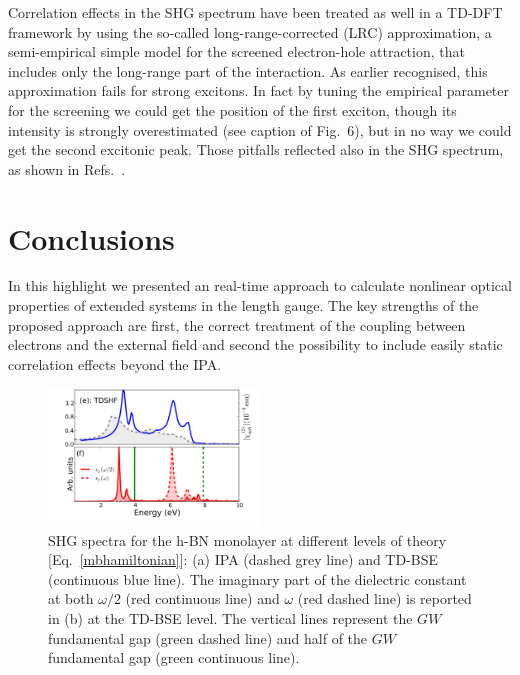 Correlation effects in the SHG spectrum have been treated as well in a TD-DFT framework\cite{PhysRevB.82.235201} by using the so-called long-range-corrected (LRC) approximation,\cite{LRC} a semi-empirical simple model for the screened electron-hole attraction, that includes only the long-range part of the interaction. %
As earlier recognised, this approximation fails for strong excitons. In fact by tuning the empirical parameter for the screening we could get the position of the first exciton, though its intensity is strongly overestimated (see caption of Fig.~6), but in no way we could get the second excitonic peak. Those pitfalls reflected also in the SHG spectrum, as shown in Refs.~\cite{gruningtddf1,gruningtddf2}. 
\section{Conclusions}\label{conclusion}                                        
In this highlight we presented an \ai real-time approach to calculate nonlinear optical properties of extended systems in the length gauge. The key strengths of the proposed approach are first, the correct treatment of the coupling between electrons and the external field and second the possibility to include easily static correlation effects beyond the IPA. \\
\begin{figure}[H]
    \centering
\includegraphics[width=0.5\textwidth]{Figures/eps_and_X2_short}
	\caption{\footnotesize{SHG spectra for the h-BN monolayer at different levels of theory [Eq.~\eqref{mbhamiltonian}]: (a) IPA (dashed grey line) and TD-BSE (continuous blue line). The imaginary part of the dielectric constant at both $\omega/2$ (red continuous line) and $\omega$ (red dashed line) is reported in (b) at the  TD-BSE level. The vertical lines represent the $GW$ fundamental gap (green dashed line) and half of the $GW$ fundamental gap (green continuous line). \label{X2bn} }}
\end{figure}
